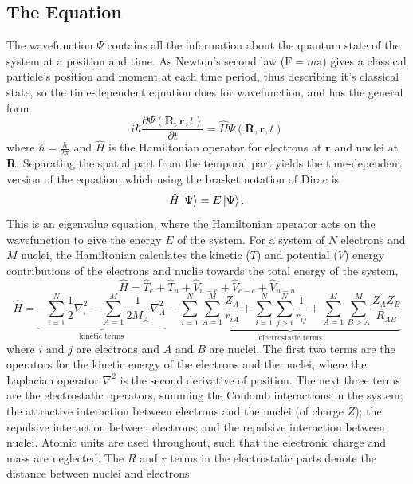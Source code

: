 \subsection{The \schro{} Equation}\label{section: QM_schrodinger}
The wavefunction $\Psi$ contains all the information about the quantum state of the system at a position and time. As Newton's second law ($\bm{\mathrm{F}}=m\bm{\mathrm{a}}$) gives a classical particle's position and moment at each time period, thus describing it's classical state, so the time-dependent \schro{} equation does for wavefunction, and has the general form
\begin{equation}\label{equation: td-schro}
    i\hbar{}\frac{\partial \Psi(\bm{R},\bm{r},t)}{\partial t}=\hat{H}\Psi(\bm{R},\bm{r},t)
\end{equation}
where $\hbar=\frac{h}{2\pi}$ and $\hat{H}$ is the Hamiltonian operator for electrons at $\bm{r}$ and nuclei at $\bm{R}$. Separating the spatial part from the temporal part yields the time-dependent version of the \schro{} equation, which using the bra-ket notation of Dirac is
\begin{equation}\label{equation: ti-schro}
   \hat{H}\ket{\Psi}=E\ket{\Psi}.
\end{equation}
This is an eigenvalue equation, where the Hamiltonian operator acts on the wavefunction to give the energy $E$ of the system. For a system of $N$ electrons and $M$ nuclei, the Hamiltonian calculates the kinetic ($T$) and potential ($V$) energy contributions of the electrons and nuclie towards the total energy of the system,
\begin{equation}\label{equation: H-simple}
\hat{H}=\hat{T}_{e}+\hat{T}_{n}+\hat{V}_{n-e}+\hat{V}_{e-e}+\hat{V}_{n-n}
\end{equation}
\begin{equation}\label{equation: H}
   \hat{H}=\underbrace{-\sum_{i=1}^{N}\frac{1}{2}\nabla_{i}^2 - \sum_{A=1}^{M}\frac{1}{2M_{A}}\nabla_{A}^2}_\text{kinetic terms}-\underbrace{\sum_{i=1}^{N}\sum_{A=1}^{M}\frac{Z_{A}}{r_{iA}}+\sum_{i=1}^{N}\sum_{j>{i}}^{N}\frac{1}{r_{ij}}+\sum_{A=1}^{M}\sum_{B>{A}}^{M}\frac{Z_{A}Z_{B}}{R_{AB}}}_\text{electrostatic terms}
\end{equation}
where $i$ and $j$ are electrons and $A$ and $B$ are nuclei. The first two terms are the operators for the kinetic energy of the electrons and the nuclei, where the Laplacian operator $\nabla^{2}$ is the second derivative of position. The next three terms are the electrostatic operators, summing the Coulomb interactions in the system;  the attractive interaction between electrons and the nuclei (of charge $Z$); the repulsive interaction between electrons; and the repulsive interaction between nuclei. Atomic units are used throughout, such that the electronic charge and mass are neglected. The $R$ and $r$ terms in the electrostatic parts denote the distance between nuclei and electrons.


